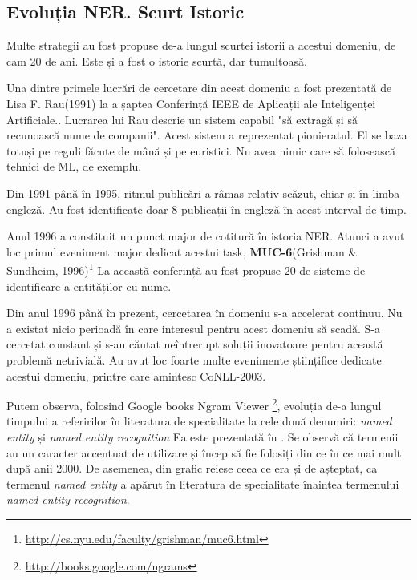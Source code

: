 \subsection{Evoluția NER. Scurt Istoric}

Multe strategii au fost propuse de-a lungul scurtei istorii a acestui domeniu, de cam 20 de ani. Este și a fost o istorie scurtă, dar tumultoasă.

Una dintre primele lucrări de cercetare din acest domeniu a fost prezentată de Lisa F. Rau(1991) la a șaptea Conferință IEEE de Aplicații ale Inteligenței Artificiale.\cite{rau1991}. Lucrarea lui Rau descrie un sistem capabil "să extragă și să recunoască nume de companii". Acest sistem a reprezentat pionieratul. El se baza totuși pe reguli făcute de mână și pe euristici. Nu avea nimic care să folosească tehnici de ML, de exemplu.

Din 1991 până în 1995, ritmul publicări a râmas relativ scăzut, chiar și în limba engleză. Au fost identificate doar 8 publicații în engleză în acest interval de timp.

Anul 1996 a constituit un punct major de cotitură în istoria NER. Atunci a avut loc primul eveniment major dedicat acestui task, \textbf{MUC-6}(Grishman \& Sundheim, 1996)\footnote{\url{http://cs.nyu.edu/faculty/grishman/muc6.html}}\cite{grishman1996} La această conferință au fost propuse 20 de sisteme de identificare a entităților cu nume.

Din anul 1996 până în prezent, cercetarea în domeniu s-a accelerat continuu. Nu a existat nicio perioadă în care interesul pentru acest domeniu să scadă. S-a cercetat constant și s-au căutat neîntrerupt soluții inovatoare pentru această problemă netrivială. Au avut loc foarte multe evenimente științifice dedicate acestui domeniu, printre care amintesc CoNLL-2003.\cite{conll2003}

Putem observa, folosind Google books Ngram Viewer \footnote{\url{http://books.google.com/ngrams}}, evoluția de-a lungul timpului a referirilor în literatura de specialitate la cele două denumiri: \textit{named entity} și \textit{named entity recognition} Ea este prezentată în . Se observă că termenii au un caracter accentuat de utilizare și încep să fie folosiți din ce în ce mai mult după anii 2000. De asemenea, din grafic reiese ceea ce era și de așteptat, ca termenul \textit{named entity} a apărut în literatura de specialitate înaintea termenului \textit{named entity recognition}.


